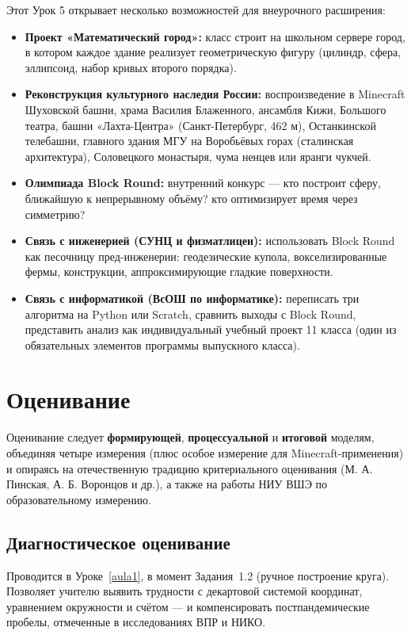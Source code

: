 \documentclass[12pt,a4paper]{scrartcl}
\newcommand{\acc}[1]{\textcolor{accent}{\textbf{#1}}}
\begin{document}
\begin{minecraft}
Этот Урок 5 открывает несколько возможностей для внеурочного расширения:
\begin{itemize}[leftmargin=1.3em,itemsep=0.15em,topsep=0.3em,nosep]
  \item \textbf{Проект «Математический город»:} класс строит на школьном сервере город, в котором каждое здание реализует геометрическую фигуру (цилиндр, сфера, эллипсоид, набор кривых второго порядка).
  \item \textbf{Реконструкция культурного наследия России:} воспроизведение в Minecraft Шуховской башни, храма Василия Блаженного, ансамбля Кижи, Большого театра, башни «Лахта-Центра» (Санкт-Петербург, 462 м), Останкинской телебашни, главного здания МГУ на Воробьёвых горах (сталинская архитектура), Соловецкого монастыря, чума ненцев или яранги чукчей.
  \item \textbf{Олимпиада Block Round:} внутренний конкурс --- кто построит сферу, ближайшую к непрерывному объёму? кто оптимизирует время через симметрию?
  \item \textbf{Связь с инженерией (СУНЦ и физматлицеи):} использовать Block Round как песочницу пред-инженерии: геодезические купола, воксе\-ли\-зированные фермы, конструкции, аппроксимирующие гладкие поверхности.
  \item \textbf{Связь с информатикой (ВсОШ по информатике):} переписать три алгоритма на Python или Scratch, сравнить выходы с Block Round, представить анализ как индивидуальный учебный проект 11 класса (один из обязательных элементов программы выпускного класса).
\end{itemize}
\end{minecraft}

\section{Оценивание}\label{sec:avaliacao}

Оценивание следует \acc{формирующей}, \acc{процессуальной} и \acc{итоговой} моделям, объединяя четыре измерения (плюс особое измерение для Minecraft-применения) и опираясь на отечественную традицию критериального оценивания (М. А. Пинская, А. Б. Воронцов и др.), а также на работы НИУ ВШЭ по образовательному измерению.

\subsection{Диагностическое оценивание}
Проводится в Уроке~\ref{aula1}, в момент Задания~1.2 (ручное построение круга). Позволяет учителю выявить трудности с декартовой системой координат, уравнением окружности и счётом --- и компенсировать постпандемические пробелы, отмеченные в исследованиях ВПР и НИКО.
\end{document}

